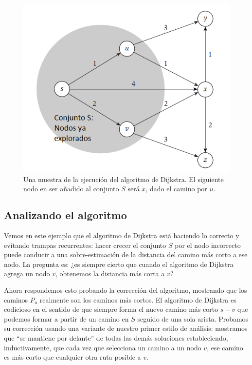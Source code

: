 \documentclass[a4paper, 12pt]{book}
\theoremstyle{dotless}
\begin{document}
\begin{figure}[h]
\centering
\includegraphics[scale=0.5]{Imagenes-Seccion4/fig_4_7.PNG}
\caption{Una muestra de la ejecución del algoritmo de Dijkstra. El siguiente nodo en ser añadido al conjunto $S$ será $x$, dado el camino por $u$.}
\label{fig:fig4.7}
\end{figure}

\subsection*{Analizando el algoritmo}

Vemos en este ejemplo que el algoritmo de Dijkstra está haciendo lo correcto y evitando trampas recurrentes: hacer crecer el conjunto $S$ por el nodo incorrecto puede conducir a una sobre-estimación de la distancia del camino más corto a ese nodo. La pregunta es:
¿es siempre cierto que cuando el algoritmo de Dijkstra agrega un nodo $v$, obtenemos la distancia más corta a $v$?

Ahora respondemos esto probando la corrección del algoritmo, mostrando que los caminos $P_u$ realmente son los caminos más cortos. El algoritmo de Dijkstra es codicioso en el sentido de que siempre forma el nuevo camino más corto $s-v$ que podemos formar a partir de un camino en $S$ seguido de una sola arista. Probamos su corrección usando una variante de nuestro primer estilo de análisis: mostramos que ``se mantiene por delante'' de todas las demás soluciones estableciendo, inductivamente, que cada vez que selecciona un camino a un nodo $v$, ese
camino es más corto que cualquier otra ruta posible a $v$.
\end{document}
